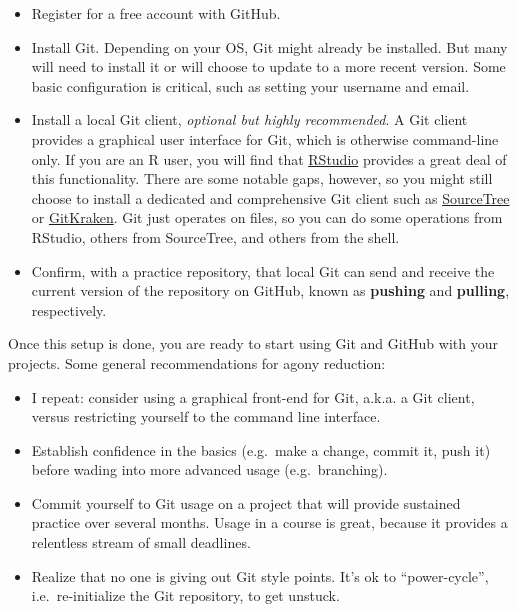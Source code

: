 \documentclass[12pt]{article}
\providecommand{\tightlist}{%
  \setlength{\itemsep}{0pt}\setlength{\parskip}{0pt}}
\begin{document}
\begin{itemize}
\item
  Register for a free account with GitHub.
\item
  Install Git. Depending on your OS, Git might already be installed. But
  many will need to install it or will choose to update to a more recent
  version. Some basic configuration is critical, such as setting your
  username and email.
\item
  Install a local Git client, \emph{optional but highly recommended}. A
  Git client provides a graphical user interface for Git, which is
  otherwise command-line only. If you are an R user, you will find that
  \href{https://www.rstudio.com/products/rstudio-desktop/}{RStudio}
  provides a great deal of this functionality. There are some notable
  gaps, however, so you might still choose to install a dedicated and
  comprehensive Git client such as
  \href{https://www.sourcetreeapp.com}{SourceTree} or
  \href{https://www.gitkraken.com}{GitKraken}. Git just operates on
  files, so you can do some operations from RStudio, others from
  SourceTree, and others from the shell.
\item
  Confirm, with a practice repository, that local Git can send and
  receive the current version of the repository on GitHub, known as
  \textbf{pushing} and \textbf{pulling}, respectively.
\end{itemize}

Once this setup is done, you are ready to start using Git and GitHub
with your projects. Some general recommendations for agony reduction:

\begin{itemize}
\tightlist
\item
  I repeat: consider using a graphical front-end for Git, a.k.a. a Git
  client, versus restricting yourself to the command line interface.
\item
  Establish confidence in the basics (e.g.~make a change, commit it,
  push it) before wading into more advanced usage (e.g.~branching).
\item
  Commit yourself to Git usage on a project that will provide sustained
  practice over several months. Usage in a course is great, because it
  provides a relentless stream of small deadlines.
\item
  Realize that no one is giving out Git style points. It's ok to
  ``power-cycle'', i.e.~re-initialize the Git repository, to get
  unstuck.
\end{itemize}
\end{document}
